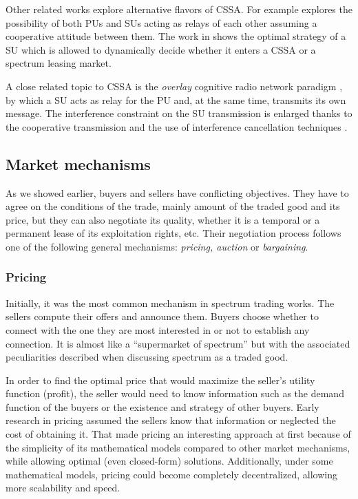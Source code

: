 Other related works explore alternative flavors of CSSA. For example \cite{ref:Tran2014} explores the possibility of both PUs and SUs acting as relays of each other assuming a cooperative attitude between them. The work in \cite{ref:Shao2014} shows the optimal strategy of a SU which is allowed to dynamically decide whether it enters a CSSA or a spectrum leasing market. 

A close related topic to CSSA is the \textit{overlay} cognitive radio network paradigm \cite{ref:Goldsmith2009}, by which a SU acts as relay for the PU and, at the same time, transmits its own message. The interference constraint on the SU transmission is enlarged thanks to the cooperative transmission and the use of interference cancellation techniques \cite{ref:Han2010}. 

\subsection{Market mechanisms}
\label{subsec:Market}
As we showed earlier, buyers and sellers have conflicting objectives. They have to agree on the conditions of the trade, mainly amount of the traded good and its price, but they can also negotiate its quality, whether it is a temporal or a permanent lease of its exploitation rights, etc. Their negotiation process follows one of the following general mechanisms: \textit{pricing, auction} or \textit{bargaining}. 
	
\subsubsection{Pricing}
Initially, it was the most common mechanism in spectrum trading works. The sellers compute their offers and announce them. Buyers choose whether to connect with the one they are most interested in or not to establish any connection. It is almost like a ``supermarket of spectrum'' but with the associated peculiarities described when discussing spectrum as a traded good. 

In order to find the optimal price that would maximize the seller's utility function (profit), the seller would need to know information such as the demand function of the buyers or the existence and strategy of other buyers. Early research in pricing assumed the sellers know that information or neglected the cost of obtaining it. That made pricing an interesting approach at first because of 
the simplicity of its mathematical models compared to other market mechanisms, while allowing optimal (even closed-form) solutions. Additionally, under some mathematical models, pricing could become completely decentralized, allowing more scalability and speed.

